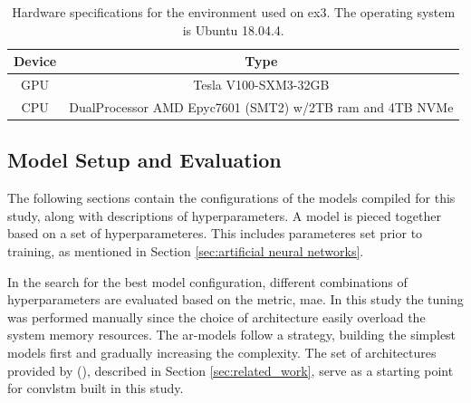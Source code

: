 \begin{table}[ht]
    \centering
    \begin{tabular}{c|c}
        Device &  Type  \\ \hline
        GPU & Tesla V100-SXM3-32GB \\
        CPU & DualProcessor AMD Epyc7601 (SMT2) w/2TB ram and 4TB NVMe 
    \end{tabular}
    \caption{Hardware specifications for the environment used on \acrshort{ex3}. The operating system is Ubuntu 18.04.4.}
    \label{tab:hardware_ex3}
\end{table}
\subsection{Model Setup and Evaluation}
The following sections contain the configurations of the models compiled for this study, along with descriptions of hyperparameters. A model is pieced together based on a set of hyperparameteres. This includes parameteres set prior to training, as mentioned in Section \ref{sec:artificial neural networks}.

In the search for the best model configuration, different combinations of hyperparameters are evaluated based on the metric, \acrfull{mae}. In this study the tuning was performed manually since the choice of architecture easily overload the system memory resources. The \acrshort{ar}-models follow a strategy, building the simplest models first and gradually increasing the complexity. The set of architectures provided by \citeauthor{SunAirLSTM} (\citeyear{SunAirLSTM}), described in Section \ref{sec:related_work}, serve as a starting point for \acrshort{convlstm} built in this study.  %

